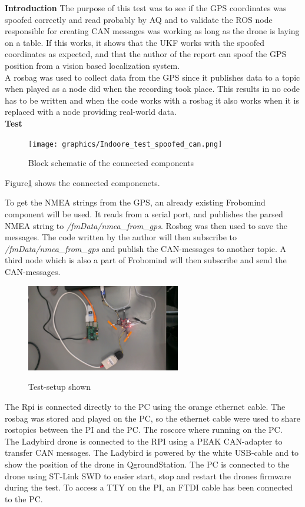 \textbf{Introduction}
The purpose of this test was to see if the GPS coordinates was spoofed correctly and read probably by AQ and to validate the ROS node responsible for creating CAN messages was working as long as the drone is laying on a table. If this works, it shows that the UKF works with the spoofed coordinates as expected, and that the author of the report can spoof the GPS position from a vision based localization system. \\

A rosbag was used to collect data from the GPS since it publishes data to a topic when played as a node did when the recording took place. This results in no code has to be written and when the code works with a rosbag it also works when it is replaced with a node providing real-world data. \\

\textbf{Test}
\begin{figure}[H]
    \center
    \texttt{[image: graphics/Indoore\_test\_spoofed\_can.png]}
    \caption{Block schematic of the connected components}
    \label{fig:test_block}
\end{figure}


Figure\ref{fig:test_block} shows the connected componenets. 


To get the NMEA strings from the GPS, an already existing Frobomind component will be used. It reads from a serial port, and publishes the parsed NMEA string to \textit{/fmData/nmea\_from\_gps}. Rosbag was then used to save the messages.
The code written by the author will then subscribe to \textit{/fmData/nmea\_from\_gps} and publish the CAN-messages to another topic. A third node which is also a part of Frobomind will then subscribe and send the CAN-messages.

\begin{figure}[H]
    \center
    \includegraphics[width=0.6\textwidth]{graphics/test_test_setup_hw.jpg}
  \label{fig:boat1}
  \caption{Test-setup shown}
\end{figure}


The Rpi is connected directly to the PC using the orange ethernet cable.
The rosbag was stored and played on the PC, so the ethernet cable were used to share rostopics between the PI and the PC. The roscore where running on the PC.\\
The Ladybird drone is connected to the RPI using a PEAK CAN-adapter to transfer CAN messages. The Ladybird is powered by the white USB-cable and to show the position of the drone in QgroundStation. The PC is connected to the drone using ST-Link SWD to easier start, stop and restart the drones firmware during the test. To access a TTY on the PI, an FTDI cable has been connected to the PC.


